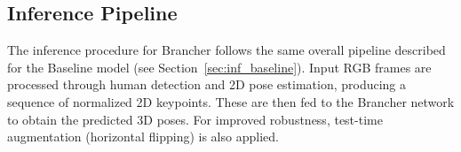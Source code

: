 \subsection{Inference Pipeline}
The inference procedure for Brancher follows the same overall pipeline described for the Baseline model (see Section~\ref{sec:inf_baseline}). Input RGB frames are processed through human detection and 2D pose estimation, producing a 
sequence of normalized 2D keypoints. These are then fed to the Brancher network to obtain the predicted 3D poses. For improved robustness, test-time augmentation (horizontal flipping) is also applied.